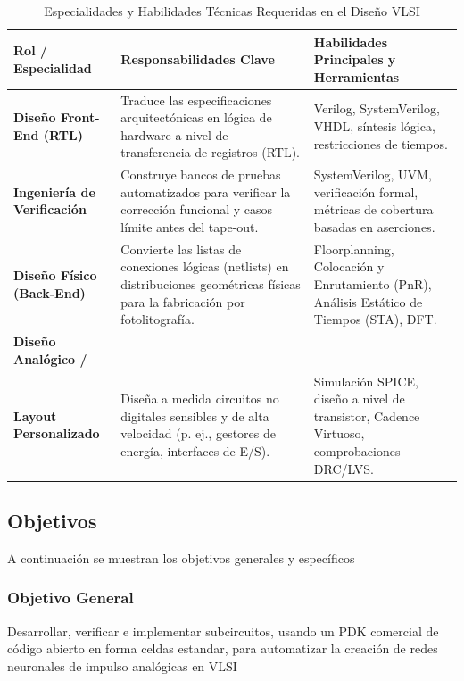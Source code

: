\documentclass[letter, 12pt]{article}
\begin{document}
\begin{table}[htbp]
\centering
\caption{Especialidades y Habilidades  Técnicas Requeridas en el Diseño VLSI}
\label{tab:vlsi_specializations}
\small
\begin{tabularx}{\textwidth}{>{\bfseries}l X X}
\toprule
Rol / Especialidad & Responsabilidades Clave & Habilidades Principales y Herramientas \\
\midrule
Diseño Front-End (RTL) 
    & Traduce las especificaciones arquitectónicas en lógica de hardware a nivel de transferencia de registros (RTL). 
    & Verilog, SystemVerilog, VHDL, síntesis lógica, restricciones de tiempos. \\
\addlinespace
Ingeniería de Verificación 
    & Construye bancos de pruebas automatizados para verificar la corrección funcional y casos límite antes del tape-out. 
    & SystemVerilog, UVM, verificación formal, métricas de cobertura basadas en aserciones. \\
\addlinespace
Diseño Físico (Back-End) 
    & Convierte las listas de conexiones lógicas (netlists) en distribuciones geométricas físicas para la fabricación por fotolitografía. 
    & Floorplanning, Colocación y Enrutamiento (PnR), Análisis Estático de Tiempos (STA), DFT. \\
\addlinespace
Diseño Analógico / \\Layout Personalizado 
    & Diseña a medida circuitos no digitales sensibles y de alta velocidad (p. ej., gestores de energía, interfaces de E/S). 
    & Simulación SPICE, diseño a nivel de transistor, Cadence Virtuoso, comprobaciones DRC/LVS. \\
\bottomrule
\end{tabularx}
\end{table}


\subsection{Objetivos}

A continuación se muestran los objetivos generales y específicos


\subsubsection{Objetivo General}
Desarrollar, verificar e implementar subcircuitos, usando un PDK comercial de código abierto en forma celdas estandar, para automatizar la creación de redes neuronales de impulso analógicas en VLSI
\end{document}
